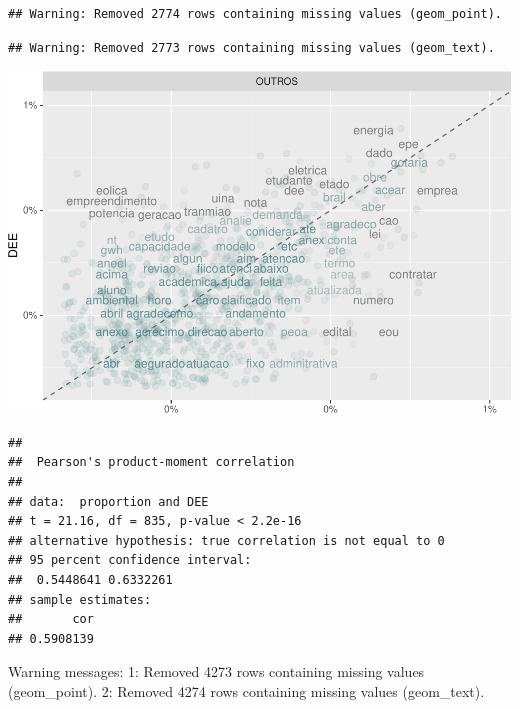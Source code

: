 \documentclass[]{article}
\newenvironment{Shaded}{\begin{snugshade}}{\end{snugshade}}
\newcommand{\KeywordTok}[1]{\textcolor[rgb]{0.13,0.29,0.53}{\textbf{#1}}}
\newcommand{\DataTypeTok}[1]{\textcolor[rgb]{0.13,0.29,0.53}{#1}}
\newcommand{\StringTok}[1]{\textcolor[rgb]{0.31,0.60,0.02}{#1}}
\newcommand{\FunctionTok}[1]{\textcolor[rgb]{0.00,0.00,0.00}{#1}}
\newcommand{\OperatorTok}[1]{\textcolor[rgb]{0.81,0.36,0.00}{\textbf{#1}}}
\newcommand{\AttributeTok}[1]{\textcolor[rgb]{0.77,0.63,0.00}{#1}}
\newcommand{\NormalTok}[1]{#1}
\begin{document}
\begin{verbatim}
## Warning: Removed 2774 rows containing missing values (geom_point).
\end{verbatim}

\begin{verbatim}
## Warning: Removed 2773 rows containing missing values (geom_text).
\end{verbatim}

\includegraphics{markdown_v40_files/figure-latex/unnamed-chunk-63-1.pdf}

\begin{Shaded}
\end{Shaded}

\begin{verbatim}
## 
##  Pearson's product-moment correlation
## 
## data:  proportion and DEE
## t = 21.16, df = 835, p-value < 2.2e-16
## alternative hypothesis: true correlation is not equal to 0
## 95 percent confidence interval:
##  0.5448641 0.6332261
## sample estimates:
##       cor 
## 0.5908139
\end{verbatim}

\begin{Shaded}
\begin{Highlighting}[]
\FunctionTok{Warning messages:}
\FunctionTok{1:}\AttributeTok{ Removed 4273 rows containing missing values (geom_point). }
\FunctionTok{2:}\AttributeTok{ Removed 4274 rows containing missing values (geom_text).}
\end{Highlighting}
\end{Shaded}
\end{document}
